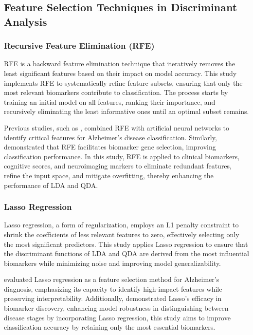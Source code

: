 \documentclass[12pt]{article}
\begin{document}
\subsection{Feature Selection Techniques in Discriminant Analysis}
\subsubsection{Recursive Feature Elimination (RFE)}
\noindent

RFE is a backward feature elimination technique that iteratively removes the least significant features based on their impact on model accuracy. This study implements RFE to systematically refine feature subsets, ensuring that only the most relevant biomarkers contribute to classification. The process starts by training an initial model on all features,
ranking their importance, and recursively eliminating the least informative ones until an optimal subset remains.

Previous studies, such as \cite{balakrishnan2020_rfe_ann_ad}, combined RFE with artificial neural networks to identify critical features for Alzheimer's disease classification. Similarly, \cite{alshamlan2018_biomarker_gene_selection} demonstrated that RFE facilitates biomarker gene selection, improving classification performance. In this study, RFE is applied
to clinical biomarkers, cognitive scores, and neuroimaging markers to eliminate redundant features, refine the input space, and mitigate overfitting, thereby enhancing the performance of LDA and QDA.

\subsubsection{Lasso Regression}
\noindent

Lasso regression, a form of regularization, employs an L1 penalty constraint to shrink the coefficients of less relevant features to zero, effectively selecting only the most significant predictors. This study applies Lasso regression to ensure that the discriminant functions of LDA and QDA are derived from the most influential biomarkers while minimizing
noise and improving model generalizability.

\cite{gu2020_feature_selection_ad} evaluated Lasso regression as a feature selection method for Alzheimer's diagnosis, emphasizing its capacity to identify high-impact features while preserving interpretability. Additionally, \cite{spooner2020_ensemble_feature_selection} demonstrated Lasso's efficacy in biomarker discovery, enhancing model robustness in
distinguishing between disease stages by incorporating Lasso regression, this study aims to improve classification accuracy by retaining only the most essential biomarkers.
\end{document}
